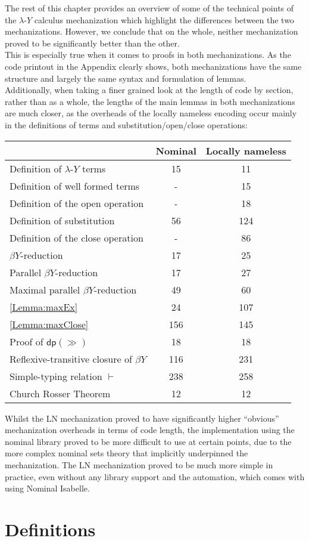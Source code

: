 \documentclass[a4paper, 12pt, twoside]{style/ociamthesis}
\theoremstyle{plain}
\theoremstyle{definition}
\theoremstyle{remark}
\newcommand{\lamy}{\lambda\text{-}Y}
\newcommand{\dip}{\textsf{dp}}
\begin{document}
The rest of this chapter provides an overview of some of the technical
points of the \(\lamy\) calculus mechanization which highlight the
differences between the two mechanizations. However, we conclude that on
the whole, neither mechanization proved to be significantly better than
the other.\\
This is especially true when it comes to proofs in both mechanizations.
As the code printout in the Appendix clearly shows, both mechanizations
have the same structure and largely the same syntax and formulation of
lemmas.\\
Additionally, when taking a finer grained look at the length of code by
section, rather than as a whole, the lengths of the main lemmas in both
mechanizations are much closer, as the overheads of the locally nameless
encoding occur mainly in the definitions of terms and
substitution/open/close operations:

\begin{longtable}[]{@{}lcc@{}}
\toprule
\(\ \) & Nominal & Locally nameless\tabularnewline
\midrule
\endhead
Definition of \(\lamy\) terms & 15 & 11\tabularnewline
Definition of well formed terms & - & 15\tabularnewline
Definition of the open operation & - & 18\tabularnewline
Definition of substitution & 56 & 124\tabularnewline
Definition of the close operation & - & 86\tabularnewline
\(\beta Y\)-reduction & 17 & 25\tabularnewline
Parallel \(\beta Y\)-reduction & 17 & 27\tabularnewline
Maximal parallel \(\beta Y\)-reduction & 49 & 60\tabularnewline
\cref{Lemma:maxEx} & 24 & 107\tabularnewline
\cref{Lemma:maxClose} & 156 & 145\tabularnewline
Proof of \(\dip(\gg)\) & 18 & 18\tabularnewline
Reflexive-transitive closure of \(\beta Y\) & 116 & 231\tabularnewline
Simple-typing relation \(\vdash\) & 238 & 258\tabularnewline
Church Rosser Theorem & 12 & 12\tabularnewline
\bottomrule
\end{longtable}

Whilst the LN mechanization proved to have significantly higher
``obvious'' mechanization overheads in terms of code length, the
implementation using the nominal library proved to be more difficult to
use at certain points, due to the more complex nominal sets theory that
implicitly underpinned the mechanization. The LN mechanization proved to
be much more simple in practice, even without any library support and
the automation, which comes with using Nominal Isabelle.\\

\section{Definitions}\label{definitions-1}
\end{document}
